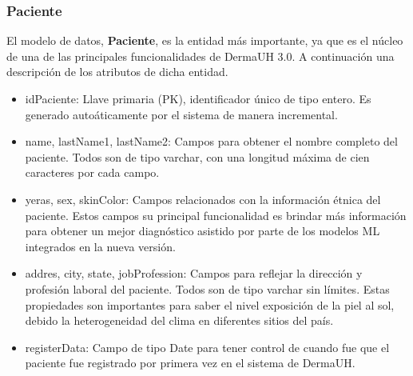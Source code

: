 \subsubsection{Paciente}
El modelo de datos, \textbf{Paciente}, es la entidad m\'as importante, ya que es el n\'ucleo
de una de las principales funcionalidades de DermaUH 3.0. A continuaci\'on una descripci\'on 
de los atributos de dicha entidad.
\begin{itemize}
    \item idPaciente: Llave primaria (PK), identificador \'unico de tipo entero. Es generado auto\'aticamente por el sistema de manera incremental.
    \item name, lastName1, lastName2: Campos para obtener el nombre completo del paciente. Todos son de tipo varchar, con una longitud m\'axima de cien caracteres por cada campo.
    \item yeras, sex, skinColor: Campos relacionados con la informaci\'on \'etnica del paciente. Estos campos su principal funcionalidad es brindar m\'as informaci\'on para obtener un mejor diagn\'ostico asistido por parte de los modelos ML integrados en la nueva versi\'on.
    \item addres, city, state, jobProfession: Campos para reflejar la direcci\'on y profesi\'on laboral del paciente. Todos son de tipo varchar sin l\'imites. Estas propiedades son importantes para saber el nivel exposici\'on de la piel al sol, debido la heterogeneidad del clima en diferentes sitios del pa\'is.
    \item registerData: Campo de tipo Date para tener control de cuando fue que el paciente fue registrado por primera vez en el sistema de DermaUH.
\end{itemize}

